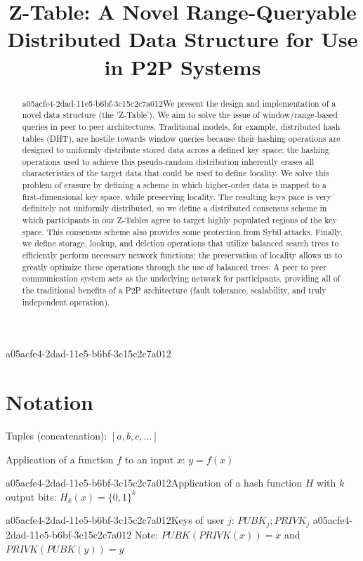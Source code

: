 \documentclass[12pt]{article}
\title{Z-Table: A Novel Range-Queryable Distributed Data Structure for Use in P2P Systems}
\begin{document}
a05acfe4-2dad-11e5-b6bf-3c15c2c7a012
\maketitle

\begin{abstract}
a05acfe4-2dad-11e5-b6bf-3c15c2c7a012We present the design and implementation of a novel data structure (the 'Z-Table'). We aim to solve the issue of window/range-based queries in peer to peer architectures. Traditional models, for example,  distributed hash tables (DHT), are hostile towards window queries because their hashing operations are designed to uniformly distribute stored data across a defined key space; the hashing operations used to achieve this pseudo-random distribution inherently erases all characteristics of the target data that could be used to define locality. We solve this problem of erasure by defining a scheme in which higher-order data is mapped to a first-dimensional key space, while preserving locality. The resulting keys pace is very definitely not uniformly distributed, so we define a distributed consensus scheme in which participants in our Z-Tables agree to target highly populated regions of the key space. This consensus scheme also provides some protection from Sybil attacks. Finally, we define storage, lookup, and deletion operations that utilize balanced search trees to efficiently perform necessary network functions; the preservation of locality allows us to greatly optimize these operations through the use of balanced trees. A peer to peer communication system acts as the underlying network for participants, providing all of the traditional benefits of a P2P architecture (fault tolerance, scalability, and truly independent operation).
\end{abstract}

\section{Notation}

Tuples (concatenation): $[a,b,c,...]$

Application of a function $f$ to an input $x$: $y=f(x)$

a05acfe4-2dad-11e5-b6bf-3c15c2c7a012Application of a hash function $H$ with $k$ output bits: $H_{k}(x) = \{0,1\}^k$

a05acfe4-2dad-11e5-b6bf-3c15c2c7a012Keys of user $j$: $ PUBK_j; PRIVK_j $
a05acfe4-2dad-11e5-b6bf-3c15c2c7a012
Note: $PUBK(PRIVK(x)) = x$ and $PRIVK(PUBK(y)) = y$~
\end{document}
